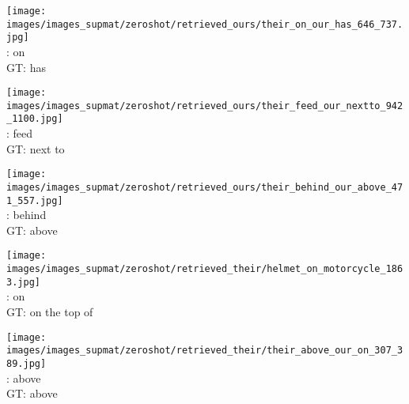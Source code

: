 \documentclass[10pt,twocolumn,letterpaper]{article}
\begin{document}
\begin{figure*}[t]
    \begin{minipage}[t]{0.185\textwidth}
    	\centering
       	\texttt{[image: images/images\_supmat/zeroshot/retrieved\_ours/their\_on\_our\_has\_646\_737.jpg]}\\
       	\vspace{0.3ex}
       	\cite{Lu16}: on \\
       	GT: has
       	\vspace{2ex}
    \end{minipage}
    \hspace{0.005\textwidth}
    \begin{minipage}[t]{0.185\textwidth}
       \centering
       \texttt{[image: images/images\_supmat/zeroshot/retrieved\_ours/their\_feed\_our\_nextto\_942\_1100.jpg]}\\
       \vspace{0.3ex}
       \cite{Lu16}: feed \\
       GT: next to
       \vspace{0.2ex}
    \end{minipage}
    \hspace{0.005\textwidth}
    \begin{minipage}[t]{0.185\textwidth}
       \centering
       \texttt{[image: images/images\_supmat/zeroshot/retrieved\_ours/their\_behind\_our\_above\_471\_557.jpg]}\\
       \vspace{0.3ex}
       \cite{Lu16}: behind \\
       GT: above
       \vspace{0.2ex}
    \end{minipage}
    \hspace{0.005\textwidth}
    \begin{minipage}[t]{0.185\textwidth}
    	\centering
       	\texttt{[image: images/images\_supmat/zeroshot/retrieved\_their/helmet\_on\_motorcycle\_1863.jpg]}\\
       	\vspace{0.3ex}
       	\cite{Lu16}: on \\
       	GT: on the top of
       	\vspace{0.2ex}
    \end{minipage}
    \hspace{0.005\textwidth} 
    \begin{minipage}[t]{0.185\textwidth}
    	\centering
       	\texttt{[image: images/images\_supmat/zeroshot/retrieved\_their/their\_above\_our\_on\_307\_389.jpg]}\\
       	\vspace{0.3ex}
       	\cite{Lu16}: above \\
       	GT: above
      	\vspace{0.2ex}
    \end{minipage}  



\end{figure*}
\end{document}
